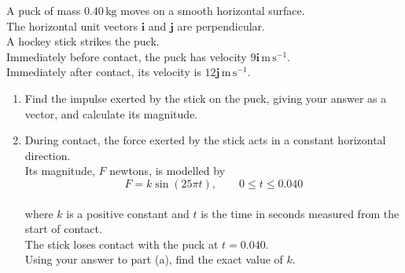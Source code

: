 \documentclass[leqno]{article}
\begin{document}
\djsFrontMatter
\begin{enumerate}[
  label=\textbf{\arabic*.},
  leftmargin=*,
  topsep=0pt,
  partopsep=0pt,
  parsep=0pt
]

\questionitem

A puck of mass $0.40\,\mathrm{kg}$ moves on a smooth horizontal surface. \\
The horizontal unit vectors $\mathbf{i}$ and $\mathbf{j}$ are perpendicular. \\

A hockey stick strikes the puck. \\
Immediately before contact, the puck has velocity $9\mathbf{i}\,\mathrm{m\,s^{-1}}$. \\
Immediately after contact, its velocity is $12\mathbf{j}\,\mathrm{m\,s^{-1}}$. \\
\begin{enumerate}[label=\textbf{(\alph*)}]
\item Find the impulse exerted by the stick on the puck, giving your answer as a vector, and calculate its magnitude.  \\
\item During contact, the force exerted by the stick acts in a constant horizontal direction. \\
Its magnitude, $F$ newtons, is modelled by
\[
F=k\sin(25\pi t),\qquad 0\leq t\leq 0.040
\] \\
where $k$ is a positive constant and $t$ is the time in seconds measured from the start of contact. \\
The stick loses contact with the puck at $t=0.040$. \\
Using your answer to part (a), find the exact value of $k$.  \\
\end{enumerate}

\newpage

\questionitem


\end{enumerate}
\end{document}
